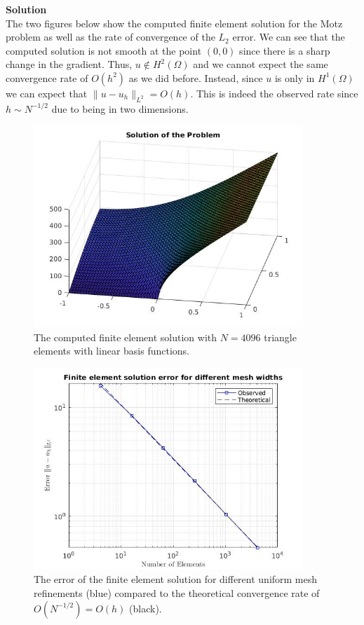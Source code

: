 \documentclass[11pt]{article}
\begin{document}
\begin{enumerate}
{\bf Solution}\\
The two figures below show the computed finite element solution for the Motz problem as well as the rate of convergence of the $L_2$ error.  We can see that the computed solution is not smooth at the point $(0,0)$ since there is a sharp change in the gradient.  Thus, $u \not \in H^2(\Omega)$ and we cannot expect the same convergence rate of $O(h^2)$ as we did before.  Instead, since $u$ is only in $H^1(\Omega)$ we can expect that $\|u - u_h\|_{L^2} = O(h)$.  This is indeed the observed rate since $h \sim N^{-1/2}$ due to being in two dimensions.

\begin{figure}[H]
\centering
\includegraphics[width = 4in]{motz_sol.jpg}
\caption{The computed finite element solution with $N = 4096$ triangle elements with linear basis functions.}
\label{fig:motz_sol}
\end{figure}

\begin{figure}[H]
\centering
\includegraphics[width = 4in]{motz_convergence.jpg}
\caption{The error of the finite element solution for different uniform mesh refinements (blue) compared to the theoretical convergence rate of $O(N^{-1/2}) = O(h)$ (black).}
\label{fig:motz_convergence}
\end{figure}


\end{enumerate}
\end{document}
